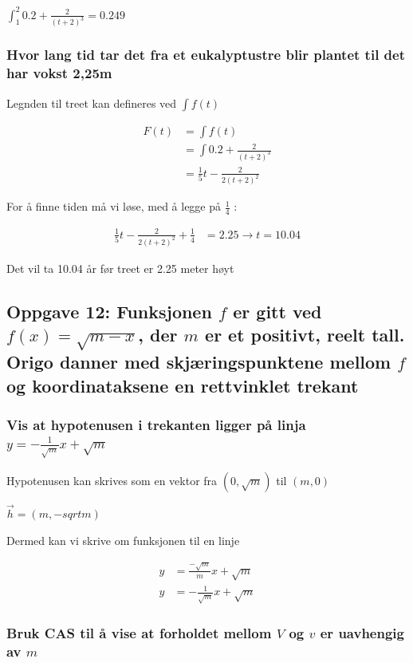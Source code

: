 \documentclass{article}
\begin{document}
$\int_{1}^{2}0.2+\frac{2}{(t+2)^3}=0.249$

\subsubsection{Hvor lang tid tar det fra et eukalyptustre blir plantet til det har vokst 2,25m}

Legnden til treet kan defineres ved $\int f(t)$

\begin{align*}
    F(t) &= \int f(t) \\
    &= \int 0.2+\frac{2}{(t+2)^3} \\
    &= \frac{1}{5}t - \frac{2}{2(t+2)^2}
\end{align*}

For å finne tiden må vi løse, med å legge på $\frac{1}{4}$ : 

\begin{align*}
    \frac{1}{5}t - \frac{2}{2(t+2)^2} + \frac{1}{4} &= 2.25 \rightarrow t = 10.04
\end{align*}

Det vil ta 10.04 år før treet er 2.25 meter høyt

\subsection{Oppgave 12: Funksjonen $f$ er gitt ved $f(x)=\sqrt{m-x}$, der $m$ er et positivt, reelt tall. Origo danner med skjæringspunktene mellom $f$ og koordinataksene en rettvinklet trekant}

\subsubsection{Vis at hypotenusen i trekanten ligger på linja $y=-\frac{1}{\sqrt{m}}x + \sqrt{m}$}

Hypotenusen kan skrives som en vektor fra $(0, \sqrt{m})$ til $(m, 0)$

$\vec{h} = (m, -sqrt{m})$

Dermed kan vi skrive om funksjonen til en linje

\begin{align*}
    y &= \frac{-\sqrt{m}}{m}x + \sqrt{m} \\
    y &= -\frac{1}{\sqrt{m}}x + \sqrt{m}
\end{align*}

\subsubsection{Bruk CAS til å vise at forholdet mellom $V$ og $v$ er uavhengig av $m$}
\end{document}
